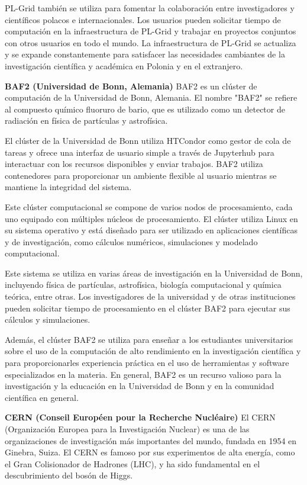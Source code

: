 \begin{spacing}{1.5}
\begin{multicols}{2}
  PL-Grid también se utiliza para fomentar la colaboración entre investigadores y científicos polacos e internacionales. Los usuarios pueden solicitar tiempo de computación en la infraestructura de PL-Grid y trabajar en proyectos conjuntos con otros usuarios en todo el mundo. La infraestructura de PL-Grid se actualiza y se expande constantemente para satisfacer las necesidades cambiantes de la investigación científica y académica en Polonia y en el extranjero.
  

  \textbf{BAF2 (Universidad de Bonn, Alemania)}
  \newline
  BAF2 es un clúster de computación de la Universidad de Bonn, Alemania. El nombre "BAF2" se refiere al compuesto químico fluoruro de bario, que es utilizado como un detector de radiación en física de partículas y astrofísica.
  
  El clúster de la Universidad de Bonn utiliza HTCondor como gestor de cola de tareas y ofrece una interfaz de usuario simple a través de Jupyterhub para interactuar con los recursos disponibles y enviar trabajos. BAF2 utiliza contenedores para proporcionar un ambiente flexible al usuario mientras se mantiene la integridad del sistema.

  Este clúster computacional se compone de varios nodos de procesamiento, cada uno equipado con múltiples núcleos de procesamiento. El clúster utiliza Linux en su sistema operativo y está diseñado para ser utilizado en aplicaciones científicas y de investigación, como cálculos numéricos, simulaciones y modelado computacional.

  Este sistema se utiliza en varias áreas de investigación en la Universidad de Bonn, incluyendo física de partículas, astrofísica, biología computacional y química teórica, entre otras. Los investigadores de la universidad y de otras instituciones pueden solicitar tiempo de procesamiento en el clúster BAF2 para ejecutar sus cálculos y simulaciones.

    Además, el clúster BAF2 se utiliza para enseñar a los estudiantes universitarios sobre el uso de la computación de alto rendimiento en la investigación científica y para proporcionarles experiencia práctica en el uso de herramientas y software especializados en la materia. En general, BAF2 es un recurso valioso para la investigación y la educación en la Universidad de Bonn y en la comunidad científica en general.

  \textbf{CERN (Conseil Européen pour la Recherche Nucléaire)}
  \newline
  El CERN (Organización Europea para la Investigación Nuclear) es una de las organizaciones de investigación más importantes del mundo, fundada en 1954 en Ginebra, Suiza. El CERN es famoso por sus experimentos de alta energía, como el Gran Colisionador de Hadrones (LHC), y ha sido fundamental en el descubrimiento del bosón de Higgs.


\end{multicols}
\end{spacing}

